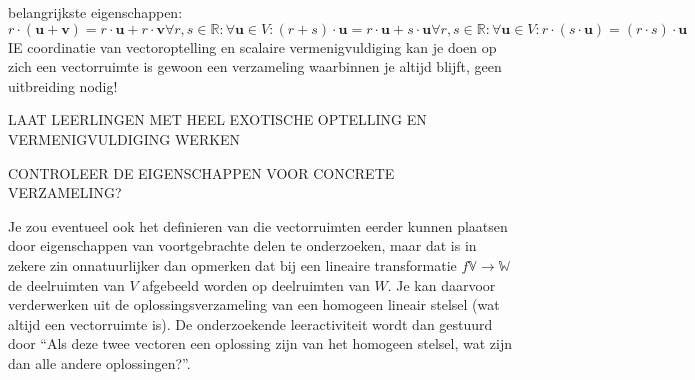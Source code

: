\documentclass{ximera}
\begin{document}
\author{Alexander Holvoet}

belangrijkste eigenschappen:
$$
r\cdot (\mathbf{u}+\mathbf{v})=r\cdot \mathbf{u}+r\cdot \mathbf{v}
\forall r,s\in \mathbb{R}:\forall \mathbf{u} \in V:(r+s)\cdot \mathbf{u}=r\cdot \mathbf{u}+s \cdot \mathbf{u}
\forall r,s\in \mathbb{R}:\forall \mathbf{u} \in V:r\cdot (s\cdot \mathbf{u})=(r\cdot s) \cdot \mathbf{u}
$$
IE coordinatie van vectoroptelling en scalaire vermenigvuldiging
kan je doen op zich
een vectorruimte is gewoon een verzameling waarbinnen je altijd blijft, geen uitbreiding nodig!

LAAT LEERLINGEN MET HEEL EXOTISCHE OPTELLING EN VERMENIGVULDIGING WERKEN

CONTROLEER DE EIGENSCHAPPEN VOOR CONCRETE VERZAMELING?

Je zou eventueel ook het definieren van die vectorruimten eerder kunnen plaatsen door eigenschappen van voortgebrachte delen te onderzoeken, maar dat is in zekere zin onnatuurlijker dan opmerken dat bij een lineaire transformatie \(f \mathbb{V} \to \mathbb{W}\) de deelruimten van \(V\) afgebeeld worden op deelruimten van \(W\).
Je kan daarvoor verderwerken uit de oplossingsverzameling van een homogeen lineair stelsel (wat altijd een vectorruimte is).
De onderzoekende leeractiviteit wordt dan gestuurd door ``Als deze twee vectoren een oplossing zijn van het homogeen stelsel, wat zijn dan alle andere oplossingen?''.
\end{document}
